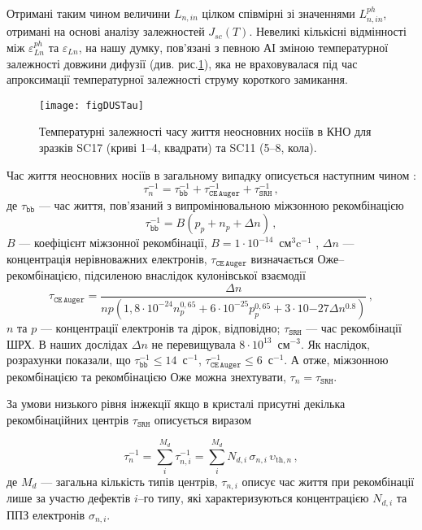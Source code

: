 Отримані таким чином величини $L_{n,in}$ цілком співмірні зі значеннями $L_{n,in}^{ph}$, отримані на основі аналізу залежностей $J_{sc}(T)$.
Невеликі кількісні відмінності між $\varepsilon_{L n}^{ph}$ та $\varepsilon_{L n}$,
на нашу думку, пов'язані з певною АІ зміною температурної залежності довжини дифузії (див. рис.\ref{figDUSTau}),
яка не враховувалася під час апроксимації температурної залежності струму короткого замикання.


\begin{figure}
\center
\texttt{[image: figDUSTau]}%
\caption{\label{figDUSTau}
Температурні залежності часу життя неосновних носіїв в КНО
для зразків SC17 (криві 1--4, квадрати) та SC11 (5--8, кола).
\FigCaptionSSC
}%
\end{figure}

Час життя неосновних носіїв в загальному випадку описується наступним чином \cite{MurphyJAP2011}:
\begin{equation}
\label{eqTAUsum}
\tau_n^{-1}=\tau_\mathtt{bb}^{-1}+\tau_\mathtt{CE\,Auger}^{-1}+\tau_\mathtt{SRH}^{-1}\,,
\end{equation}
де
$\tau_\mathtt{bb}$ --- час життя, пов'язаний з випромінювальною міжзонною рекомбінацією
\begin{equation}
\label{eqTAUbb}
\tau_\mathtt{bb}^{-1}=B(p_p+n_p+\Delta n)\,,
\end{equation}
$B$ --- коефіцієнт міжзонної рекомбінації, $B=1\cdot10^{-14}$~см$^3$c$^{-1}$ \cite{Si:TAUbb,MurphyJAP2011},
$\Delta n$ --- концентрація нерівноважних електронів,
$\tau_\mathtt{CE\,Auger}$ визначається Оже--рекомбінацією, підсиленою внаслідок кулонівської взаємодії  \cite{Si:TAUAuger}
\begin{equation}
\label{eqTAAuger}
\tau_\mathtt{CE\,Auger}=\frac{\Delta n}{np\left(1,8\cdot10^{-24}n_p^{0,65}+6\cdot10^{-25}p_p^{0,65}+3\cdot10{-27}\Delta n^{0.8}\right)}\,,
\end{equation}
$n$ та $p$ --- концентрації електронів та дірок, відповідно;
$\tau_\mathtt{SRH}$ --- час рекомбінації ШРХ.
В наших дослідах $\Delta n$ не перевищувала $8\cdot10^{13}$~см$^{-3}$.
Як наслідок, розрахунки показали, що $\tau_\mathtt{bb}^{-1}\leq14$~с$^{-1}$, $\tau_\mathtt{CE\,Auger}^{-1}\leq6$~с$^{-1}$.
А отже, міжзонною рекомбінацією та рекомбінацією Оже можна знехтувати, $\tau_n=\tau_\mathtt{SRH}$.

За умови низького рівня інжекції якщо в кристалі присутні декілька рекомбінаційних центрів $\tau_\mathtt{SRH}$ описується виразом

\begin{equation}
\label{eqTAUSHRsum}
\tau_n^{-1}=\sum_i^{M_d}\tau_{n,i}^{-1}=\sum_i^{M_d}N_{d,i}\,\sigma_{n,i}\,\upsilon_{\mathrm{th},n}\,,
\end{equation}
де
$M_d$ --- загальна кількість типів центрів,
$\tau_{n,i}$ описує час життя при рекомбінації лише за участю дефектів $i$--го типу,
які характеризуються концентрацією $N_{d,i}$ та ППЗ електронів $\sigma_{n,i}$.

